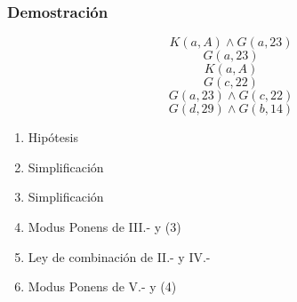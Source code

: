 \documentclass[letterpaper,10pt]{article}
\begin{document}
\subsubsection*{Demostraci\'on}
\begin{minipage}[c]{0.4\textwidth}
\begin{equation*}
    K(a,A) \wedge G(a,23)
\end{equation*}
\begin{equation*}
    G(a,23)
\end{equation*}
\begin{equation*}
    K(a,A)
\end{equation*}
\begin{equation*}
    G(c,22)
\end{equation*}
\begin{equation*}
    G(a,23) \wedge G(c,22)
\end{equation*}
\begin{equation*}
    G(d,29) \wedge G(b,14)
\end{equation*}
\end{minipage}
\begin{minipage}[c]{0.5\textwidth}
\begin{enumerate}[I{.-}]
    \item Hip\'otesis
    \item Simplificaci\'on
    \item Simplificaci\'on
    \item Modus Ponens de III.- y (3)
    \item Ley de combinaci\'on de II.- y IV.-
    \item Modus Ponens de V.- y (4)
\end{enumerate}
\end{minipage}
\end{document}
